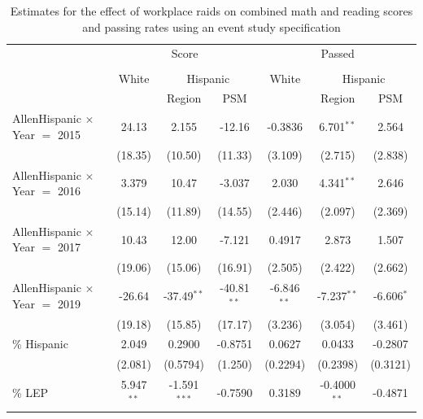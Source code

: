 \documentclass[hidelinks,twoside]{article}
\begin{document}
\begin{table}
\centering
\caption{Estimates for the effect of workplace raids on combined math and reading scores and passing rates using an event study specification}
\begin{tabular}{lcccccc}
   \tabularnewline \midrule \midrule
    & \multicolumn{3}{c}{Score} & \multicolumn{3}{c}{Passed}\\
 \cline{2-7} \\
& White & \multicolumn{2}{c}{Hispanic} & White & \multicolumn{2}{c}{Hispanic} \\
    & & Region & PSM  & & Region & PSM \\ 
   \midrule
   AllenHispanic $\times$ Year $=$ 2015    & 24.13          & 2.155          & -12.16        & -0.3836         & 6.701$^{**}$   & 2.564\\   
                                            & (18.35)        & (10.50)        & (11.33)       & (3.109)         & (2.715)        & (2.838)\\   
   AllenHispanic $\times$ Year $=$ 2016    & 3.379          & 10.47          & -3.037        & 2.030           & 4.341$^{**}$   & 2.646\\   
                                            & (15.14)        & (11.89)        & (14.55)       & (2.446)         & (2.097)        & (2.369)\\   
   AllenHispanic $\times$ Year $=$ 2017    & 10.43          & 12.00          & -7.121        & 0.4917          & 2.873          & 1.507\\   
                                            & (19.06)        & (15.06)        & (16.91)       & (2.505)         & (2.422)        & (2.662)\\   
   AllenHispanic $\times$ Year $=$ 2019     & -26.64         & -37.49$^{**}$  & -40.81$^{**}$ & -6.846$^{**}$   & -7.237$^{**}$  & -6.606$^{*}$\\   
                                            & (19.18)        & (15.85)        & (17.17)       & (3.236)         & (3.054)        & (3.461)\\   
   \% Hispanic                        & 2.049          & 0.2900         & -0.8751       & 0.0627          & 0.0433         & -0.2807\\   
                                            & (2.081)        & (0.5794)       & (1.250)       & (0.2294)        & (0.2398)       & (0.3121)\\   
   \% LEP                            & 5.947$^{**}$   & -1.591$^{***}$ & -0.7590       & 0.3189          & -0.4000$^{**}$ & -0.4871\\   

\end{tabular}
\end{table}
\end{document}

